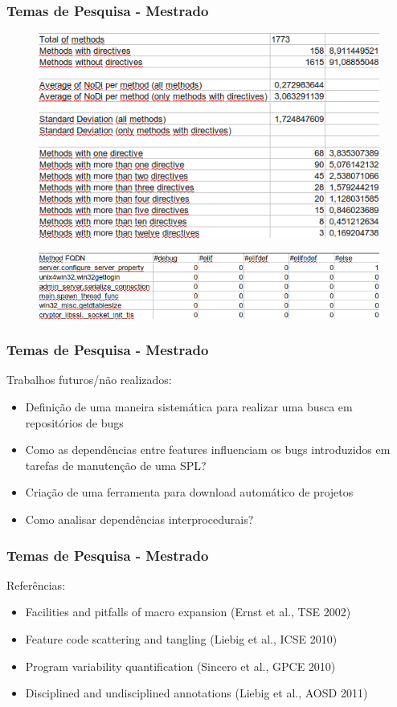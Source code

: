 \begin{frame}
\frametitle{Temas de Pesquisa - Mestrado}
\begin{center}
	\begin{figure}
		\includegraphics[width=.7\linewidth]{images/directives3}
	\end{figure}
\end{center}

\begin{center}
	\begin{figure}
		\includegraphics[width=.7\linewidth]{images/directives1}
	\end{figure}
\end{center}
\end{frame}

\begin{frame}
	\frametitle{Temas de Pesquisa - Mestrado}
	Trabalhos futuros/não realizados:
	\begin{itemize}
		\item Definição de uma maneira sistemática para realizar uma busca em repositórios de bugs
		\item Como as dependências entre features influenciam os bugs introduzidos em tarefas de manutenção de uma SPL?
		\item Criação de uma ferramenta para download automático de projetos
		\item Como analisar dependências interprocedurais?
	\end{itemize}
\end{frame}

\begin{frame}
	\frametitle{Temas de Pesquisa - Mestrado}		
	Referências:
	\begin{itemize}
		\item Facilities and pitfalls of macro expansion (Ernst et al., TSE 2002)
		\item Feature code scattering and tangling (Liebig et al., ICSE 2010)
		\item Program variability quantification (Sincero et al., GPCE 2010)
		\item Disciplined and undisciplined annotations (Liebig et al., AOSD 2011)
	\end{itemize}
\end{frame}

